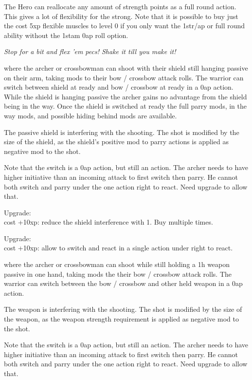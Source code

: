 The Hero can reallocate any amount of strength points as a full round action.
This gives a lot of flexibility for the strong. Note that it is possible to buy just the cost 5xp flexible muscles to level 0 if you only want the 1str/ap or full round ability without the 1stam 0ap roll option.

\noindent \emph{Stop for a bit and flex 'em pecs! Shake it till you make it!}


 where the archer or crossbowman can shoot with their shield still hanging passive on their arm, taking mods to their bow / crossbow attack rolls. The warrior can switch between shield at ready and bow / crossbow at ready in a 0ap action. While the shield is hanging passive the archer gains no advantage from the shield being in the way. Once the shield is switched at ready the full parry mods, in the way mods, and possible hiding behind mods are available.

The passive shield is interfering with the shooting. The shot is modified by the size of the shield, as the shield's positive mod to parry actions is applied as negative mod to the shot.

Note that the switch is a 0ap action, but still an action. The archer needs to have higher initiative than an incoming attack to first switch then parry. He cannot both switch and parry under the one action right to react. Need upgrade to allow that.

\noindent
Upgrade:\\
cost +10xp: reduce the shield interference with 1. Buy multiple times.

\noindent
Upgrade:\\
cost +10xp: allow to switch and react in a single action under right to react.


 where the archer or crossbowman can shoot while still holding a 1h weapon passive in one hand, taking mods the their bow / crossbow attack rolls. The warrior can switch between the bow / crossbow and other held weapon in a 0ap action.

The weapon is interfering with the shooting. The shot is modified by the size of the weapon, as the weapon strength requirement is applied as negative mod to the shot.

Note that the switch is a 0ap action, but still an action. The archer needs to have higher initiative than an incoming attack to first switch then parry. He cannot both switch and parry under the one action right to react. Need upgrade to allow that.

